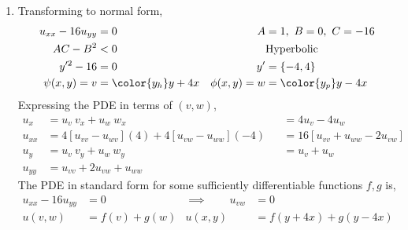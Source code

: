\begin{enumerate}
    \item Transforming to normal form,
          \begin{align}
              u_{xx} - 16u_{yy} & = 0                   &
              A                 & = 1,\ B = 0,\ C = -16   \\
              AC - B^2          & < 0                   &
                                & \text{Hyperbolic}       \\
              y'^2 -16          & = 0                   &
              y'                & = \{-4, 4\}             \\
              \psi(x, y) = v    & = \color{y_h} y + 4x  &
              \phi(x, y) = w    & = \color{y_p} y - 4x
          \end{align}
          Expressing the PDE in terms of $ (v, w) $,
          \begin{align}
              u_{x}  & = u_v\ v_x + u_w\ w_x                               &
                     & = 4 u_v - 4 u_w                                       \\
              u_{xx} & = 4[u_{vv} - u_{wv}] (4) + 4 [u_{vw} - u_{ww}] (-4) &
                     & = 16 [u_{vv} + u_{ww} - 2u_{vw}]                      \\
              u_{y}  & = u_v\ v_y + u_w\ w_y                               &
                     & = u_v + u_w                                           \\
              u_{yy} & = u_{vv} + 2u_{vw} + u_{ww}
          \end{align}
          The PDE in standard form for some sufficiently differentiable functions
          $ f, g $ is,
          \begin{align}
              u_{xx} - 16u_{yy}      & = 0                     &
              \implies \qquad u_{vw} & = 0                       \\
              u(v, w)                & = f(v) + g(w)           &
              u(x, y)                & = f(y + 4x) + g(y - 4x)
          \end{align}


\end{enumerate}
